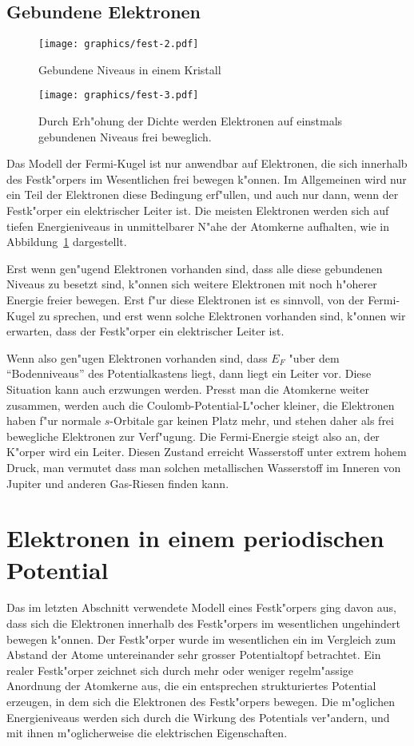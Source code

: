 \subsection{Gebundene Elektronen\label{skript:gebundeneelektronen}}
\begin{figure}
\centering
\texttt{[image: graphics/fest-2.pdf]}
\caption{Gebundene Niveaus in einem Kristall
\label{skript:gebundene-niveaus}}
\end{figure}
\begin{figure}
\centering
\texttt{[image: graphics/fest-3.pdf]}
\caption{Durch Erh"ohung der Dichte werden Elektronen auf einstmals
gebundenen Niveaus frei beweglich.
\label{skript:gebundene-niveaus-komprimiert}}
\end{figure}
Das Modell der Fermi-Kugel ist nur anwendbar auf Elektronen, die sich
innerhalb des Festk"orpers im Wesentlichen frei bewegen k"onnen.
Im Allgemeinen wird nur ein Teil der Elektronen diese Bedingung erf"ullen,
und auch nur dann, wenn der Festk"orper ein elektrischer Leiter ist.
Die meisten Elektronen werden sich auf tiefen Energieniveaus in unmittelbarer
N"ahe der Atomkerne aufhalten, wie in Abbildung~\ref{skript:gebundene-niveaus}
dargestellt.

Erst wenn gen"ugend Elektronen vorhanden sind, dass alle diese gebundenen
Niveaus zu besetzt sind, k"onnen sich weitere Elektronen mit noch h"oherer
Energie freier bewegen.
Erst f"ur diese Elektronen ist es sinnvoll, von der Fermi-Kugel zu sprechen,
und erst wenn solche Elektronen vorhanden sind, k"onnen wir erwarten,
dass der Festk"orper ein elektrischer Leiter ist.

Wenn also gen"ugen Elektronen vorhanden sind, dass $E_F$ "uber dem
``Bodenniveaus'' des Potentialkastens liegt, dann liegt ein Leiter vor.
Diese Situation kann auch erzwungen werden.
Presst man die Atomkerne weiter zusammen, werden auch die
Coulomb-Potential-L"ocher kleiner, die Elektronen haben f"ur normale
$s$-Orbitale gar keinen Platz mehr, und stehen daher als frei bewegliche
Elektronen zur Verf"ugung.
Die Fermi-Energie steigt also an, der K"orper wird ein Leiter.
Diesen Zustand erreicht Wasserstoff unter extrem hohem Druck,
man vermutet dass man solchen metallischen Wasserstoff im Inneren
von Jupiter und anderen Gas-Riesen finden kann.

\section{Elektronen in einem periodischen Potential}
Das im letzten Abschnitt verwendete Modell eines Festk"orpers ging davon aus,
dass sich die Elektronen innerhalb des Festk"orpers im wesentlichen
ungehindert bewegen k"onnen.
Der Festk"orper wurde im wesentlichen ein im Vergleich zum Abstand 
der Atome untereinander sehr grosser Potentialtopf betrachtet.
Ein realer Festk"orper zeichnet sich durch mehr oder weniger regelm"assige
Anordnung der Atomkerne aus, die ein entsprechen strukturiertes Potential
erzeugen, in dem sich die Elektronen des Festk"orpers bewegen.
Die m"oglichen Energieniveaus werden sich durch die Wirkung des Potentials
ver"andern, und mit ihnen m"oglicherweise die elektrischen Eigenschaften.

